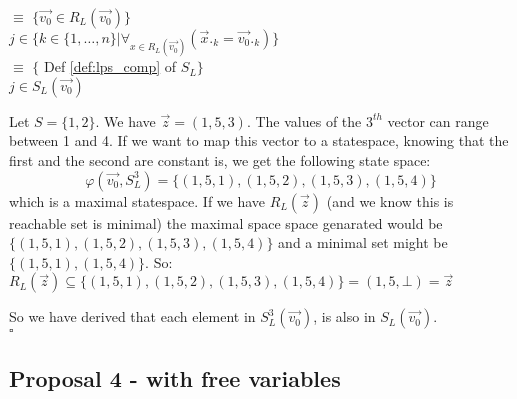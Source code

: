 \index{}\documentclass[a4paper,10pt]{article}
\theoremstyle{plain}
\theoremstyle{definition}
\newcommand{\ovr}{\overrightarrow}
\newcommand{\sq}{$\square$}
\begin{document}
\begin{itemize}
\tmp $ \equiv$ \hspace{20pt} $\lbrace \ovr{v_0}  \in R_L(\ovr{v_0}) \rbrace$\\
\tmp $ j \in \lbrace k \in \lbrace 1, \ldots, n \rbrace \vert \forall_{x \in R_L(\ovr{v_0})}(\ovr{x}._k = \ovr{v_0}._k) \rbrace$\\
\tmp $ \equiv$ \hspace{20pt} $\lbrace$ Def \ref{def:lps_comp} of $S_L\rbrace$\\
\tmp $ j \in S_L(\ovr{v_0})$

\begin{example}\label{example:proof3}
Let $S = \lbrace 1, 2 \rbrace$.
We have $\ovr{z} = (1, 5, 3)$.
The values of the $3^{th}$ vector can range between 1 and 4.
If we want to map this vector to a statespace, knowing that the first and the second are
constant is, we get the following state space:
$$  \varphi(\ovr{v_0},S_L^3) = \lbrace (1, 5, 1), (1, 5, 2), (1, 5, 3), (1, 5, 4) \rbrace$$
which is a maximal statespace.
If we have $R_L(\ovr{z})$ (and we know this is reachable set is minimal) the maximal space space genarated would be
$\lbrace (1, 5, 1), (1, 5, 2), (1, 5, 3), (1, 5, 4) \rbrace$ and a minimal set might be $\lbrace (1, 5, 1), (1, 5, 4) \rbrace$.
So:
$R_L(\ovr{z}) \subseteq \lbrace (1, 5, 1), (1, 5, 2), (1, 5, 3), (1, 5, 4) \rbrace =  (1, 5, \bot) = \ovr{z} $\\
\end{example}

\end{itemize}
So we have derived that each element in $S_L^3(\ovr{v_0})$, is also in $S_L(\ovr{v_0})$.
\\ \sq


\newpage
\subsection{Proposal 4 - with free variables}
\end{document}
